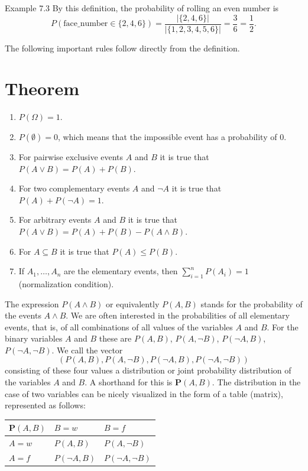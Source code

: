 \documentclass[10pt]{book}
\begin{document}
Example 7.3 By this definition, the probability of rolling an even number is
$$
P(\text{face\_number} \in \{2,4,6\})=\frac{|\{2,4,6\}|}{|\{1,2,3,4,5,6\}|}=\frac{3}{6}=\frac{1}{2} .
$$

The following important rules follow directly from the definition.

\section{Theorem}
\begin{enumerate}
  \item $P(\Omega)=1$.
  \item $P(\emptyset)=0$, which means that the impossible event has a probability of 0.
  \item For pairwise exclusive events $A$ and $B$ it is true that $P(A \vee B)=P(A)+P(B)$.
  \item For two complementary events $A$ and $\neg A$ it is true that $P(A)+P(\neg A)=1$.
  \item For arbitrary events $A$ and $B$ it is true that $P(A \vee B)=P(A)+P(B)-P(A \wedge B)$.
  \item For $A \subseteq B$ it is true that $P(A) \leq P(B)$.
  \item If $A_{1}, \ldots, A_{n}$ are the elementary events, then $\sum_{i=1}^{n} P\left(A_{i}\right)=1$ (normalization condition).
\end{enumerate}

The expression $P(A \wedge B)$ or equivalently $P(A, B)$ stands for the probability of the events $A \wedge B$. We are often interested in the probabilities of all elementary events, that is, of all combinations of all values of the variables $A$ and $B$. For the binary variables $A$ and $B$ these are $P(A, B)$, $P(A, \neg B)$, $P(\neg A, B)$, $P(\neg A, \neg B)$. We call the vector
$$
(P(A, B), P(A, \neg B), P(\neg A, B), P(\neg A, \neg B))
$$
consisting of these four values a distribution or joint probability distribution of the variables $A$ and $B$. A shorthand for this is $\boldsymbol{P}(A, B)$. The distribution in the case of two variables can be nicely visualized in the form of a table (matrix), represented as follows:

\begin{center}
\begin{tabular}{lll}
\hline
$\boldsymbol{P}(A, B)$ & $B=w$ & $B=f$ \\
\hline
$A=w$ & $P(A, B)$ & $P(A, \neg B)$ \\
\hline
$A=f$ & $P(\neg A, B)$ & $P(\neg A, \neg B)$ \\
\hline
\end{tabular}
\end{center}
\end{document}
